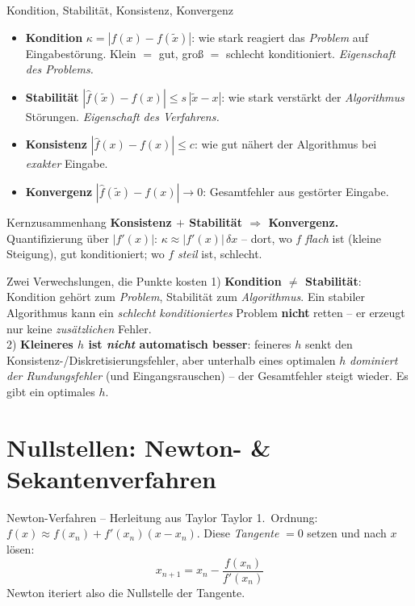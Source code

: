 \documentclass[a4paper,11pt]{article}
\begin{document}
\begin{defi}{Kondition, Stabilität, Konsistenz, Konvergenz}
\begin{itemize}
\item \textbf{Kondition} $\kappa=|f(x)-f(\tilde x)|$: wie stark reagiert das \emph{Problem} auf
  Eingabestörung. Klein $=$ gut, groß $=$ schlecht konditioniert. \emph{Eigenschaft des Problems.}
\item \textbf{Stabilität} $|\hat f(\tilde x)-\hat f(x)|\le s\,|\tilde x-x|$: wie stark verstärkt der
  \emph{Algorithmus} Störungen. \emph{Eigenschaft des Verfahrens.}
\item \textbf{Konsistenz} $|\hat f(x)-f(x)|\le c$: wie gut nähert der Algorithmus bei \emph{exakter}
  Eingabe.
\item \textbf{Konvergenz} $|\hat f(\tilde x)-f(x)|\to 0$: Gesamtfehler aus gestörter Eingabe.
\end{itemize}
\end{defi}

\begin{satz}{Kernzusammenhang}
\textbf{Konsistenz $+$ Stabilität $\Rightarrow$ Konvergenz.} Quantifizierung über $|f'(x)|$:
$\kappa\approx|f'(x)|\,\delta x$ -- dort, wo $f$ \emph{flach} ist (kleine Steigung), gut
konditioniert; wo $f$ \emph{steil} ist, schlecht.
\end{satz}

\begin{falle}{Zwei Verwechslungen, die Punkte kosten}
1) \textbf{Kondition $\ne$ Stabilität}: Kondition gehört zum \emph{Problem}, Stabilität zum
\emph{Algorithmus}. Ein stabiler Algorithmus kann ein \emph{schlecht konditioniertes} Problem
\textbf{nicht} retten -- er erzeugt nur keine \emph{zusätzlichen} Fehler.\\
2) \textbf{Kleineres $h$ ist \emph{nicht} automatisch besser}: feineres $h$ senkt den
Konsistenz-/Diskretisierungsfehler, aber unterhalb eines optimalen $h$ \emph{dominiert der
Rundungsfehler} (und Eingangsrauschen) -- der Gesamtfehler steigt wieder. Es gibt ein optimales $h$.
\end{falle}

\section{Nullstellen: Newton- \& Sekantenverfahren}

\begin{satz}{Newton-Verfahren -- Herleitung aus Taylor}
Taylor 1.\ Ordnung: $f(x)\approx f(x_n)+f'(x_n)(x-x_n)$. Diese \emph{Tangente} $=0$ setzen und nach
$x$ lösen:
\[
  \boxed{\,x_{n+1}=x_n-\frac{f(x_n)}{f'(x_n)}\,}
\]
Newton iteriert also die Nullstelle der Tangente.
\end{satz}
\end{document}
